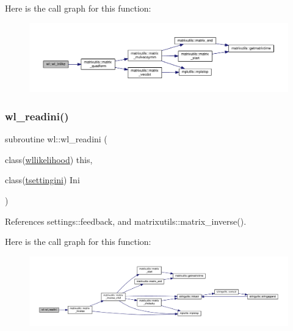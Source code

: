 Here is the call graph for this function\+:
\nopagebreak
\begin{figure}[H]
\begin{center}
\leavevmode
\includegraphics[width=350pt]{namespacewl_ae6b71112cf916069d3fc83f99af9168c_cgraph}
\end{center}
\end{figure}
\mbox{\label{namespacewl_ae5eb8a620a32ecf00fb98f6d7f2e5573}} 
\subsubsection{\texorpdfstring{wl\+\_\+readini()}{wl\_readini()}}
{\footnotesize\ttfamily subroutine wl\+::wl\+\_\+readini (\begin{DoxyParamCaption}\item[{class(\mbox{\hyperlink{structwl_1_1wllikelihood}{wllikelihood}})}]{this,  }\item[{class(\mbox{\hyperlink{structsettings_1_1tsettingini}{tsettingini}})}]{Ini }\end{DoxyParamCaption})\hspace{0.3cm}{\ttfamily [private]}}



References settings\+::feedback, and matrixutils\+::matrix\+\_\+inverse().

Here is the call graph for this function\+:
\nopagebreak
\begin{figure}[H]
\begin{center}
\leavevmode
\includegraphics[width=350pt]{namespacewl_ae5eb8a620a32ecf00fb98f6d7f2e5573_cgraph}
\end{center}
\end{figure}
\mbox{\label{namespacewl_a622c1e8033fcc6aa3474f2fd57263f4b}} 
